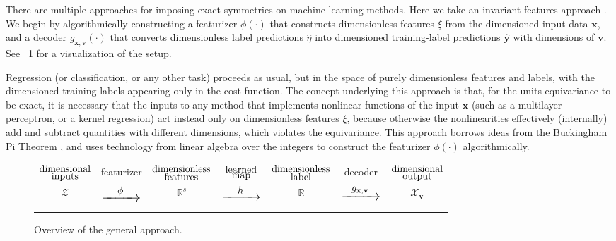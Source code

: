 \documentclass[twoside,11pt]{article}
\newcommand{\figref}[1]{\figurename~\ref{#1}}
\newcommand{\sxrightarrow}[2][]{%
  \mathrel{\text{$\xrightarrow[#1]{#2}$}}%
}
\begin{document}
There are multiple approaches for imposing exact symmetries on machine learning methods. Here we take an invariant-features approach \citep{villar}.
We begin by algorithmically constructing a featurizer $\phi(\cdot)$ that constructs dimensionless features $\xi$ from the dimensioned input data $\mathbf x$, and a decoder $g_{\mathbf x, \mathbf v}(\cdot)$ that converts dimensionless label predictions $\hat{\eta}$ into dimensioned training-label predictions $\hat{\mathbf y}$ with dimensions of $\mathbf v$.
See \figref{fig:approach} for a visualization of the setup.

Regression (or classification, or any other task) proceeds as usual, but in the space of purely dimensionless features and labels, with the dimensioned training labels appearing only in the cost function.
The concept underlying this approach is that, for the units equivariance to be exact, it is necessary that the inputs to any method that implements nonlinear functions of the input $\mathbf x$ (such as a multilayer perceptron, or a kernel regression) act instead only on dimensionless features $\xi$, because otherwise the nonlinearities effectively (internally) add and subtract quantities with different dimensions, which violates the equivariance. This approach borrows ideas from the Buckingham Pi Theorem \citep{buckingham1914pi}, and uses technology from linear algebra over the integers \citep{stanley2016smithnormalform} to construct the featurizer $\phi(\cdot)$ algorithmically. 

\begin{figure}[tp]
    \centering \small
    \begin{tabular}{ccccccc}
    \hspace{-0.8cm}
         $\let\scriptstyle\textstyle\substack{\text{dimensional}\\ \text{inputs}}$ &
         featurizer &
         $\let\scriptstyle\textstyle\substack{\text{dimensionless}\\ \text{features}}$ &
         $\let\scriptstyle\textstyle\substack{\text{learned}\\ \text{map}}$ &
         $\let\scriptstyle\textstyle\substack{\text{dimensionless}\\ \text{label}}$ &
         decoder & $\let\scriptstyle\textstyle\substack{\text{dimensional}\\ \text{output}}$ 
         \\
         \hspace{-.8cm}$\mathcal Z$
         & 
         ${\Large \sxrightarrow[\hspace*{1cm}]{\phi}}$ &  $\mathbb R^s$ & ${\Large \sxrightarrow[\hspace*{1cm}]{h}}$ & $\mathbb R$ & ${\Large \sxrightarrow[\hspace*{1cm}]{g_{\mathbf x, \mathbf v}}}$ & $\mathcal X_{\mathbf v}$ 
    \end{tabular}
    \caption{Overview of the general approach.}
    \label{fig:approach}
\end{figure}
\end{document}
